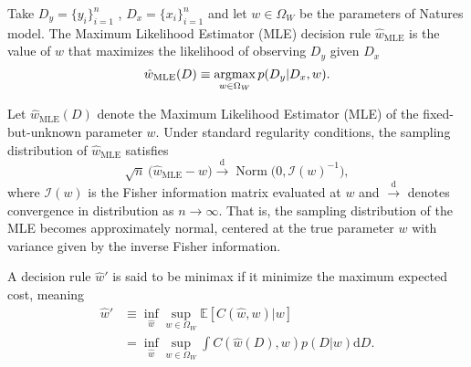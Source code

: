 \begin{definition}
	\label{def:MLE}
	Take $D_y= \{y_i\}_{i=1}^n$ , $D_x = \{x_i\}_{i=1}^n$ and let $w \in \Omega_W$ be the parameters of Natures model. The Maximum Likelihood Estimator (MLE) decision rule  $\hat{w}_{\mathrm{MLE}}$ is the value of $w$ that maximizes the likelihood of observing $D_y$ given $D_x$
	\begin{equation}
		\hat{w}_{\mathrm{MLE}}(D) \equiv \operatorname*{argmax}_{w \in \Omega_W} p(D_y | D_x, w).
	\end{equation}
\end{definition}

\begin{theorem}
	\label{thm:unbiased_mle}
	Let $\hat{w}_{\mathrm{MLE}}(D)$ denote the Maximum Likelihood Estimator (MLE) of the fixed-but-unknown parameter $w$. Under standard regularity conditions, the sampling distribution of $\hat{w}_{\mathrm{MLE}}$ satisfies
	\begin{equation}
		\sqrt{n}\,\big(\hat{w}_{\mathrm{MLE}} - w\big) \xrightarrow{\text{d}} \operatorname{Norm}\big(0, \mathcal{I}(w)^{-1}\big),
	\end{equation}
	where $\mathcal{I}(w)$ is the Fisher information matrix evaluated at $w$ and $\xrightarrow{\text{d}}$ denotes convergence in distribution as $n \to \infty$. 
	That is, the sampling distribution of the MLE becomes approximately normal, centered at the true parameter $w$ with variance given by the inverse Fisher information.
\end{theorem}


\begin{definition}
	\label{def:minimax}
	A decision rule $\hat{w}'$ is said to be minimax if it minimize the maximum expected cost, meaning
	\begin{equation}
		\begin{split}
			\hat{w}' &\equiv \inf_{\hat{w}}\sup_{w\in \Omega_W}\mathbb{E}[C(\hat{w},w)|w]\\
			& = \inf_{\hat{w}}\sup_{w\in \Omega_W}\int  C(\hat{w}(D),w) p(D|w) \mathrm{d}D.
		\end{split}
	\end{equation}
\end{definition}

